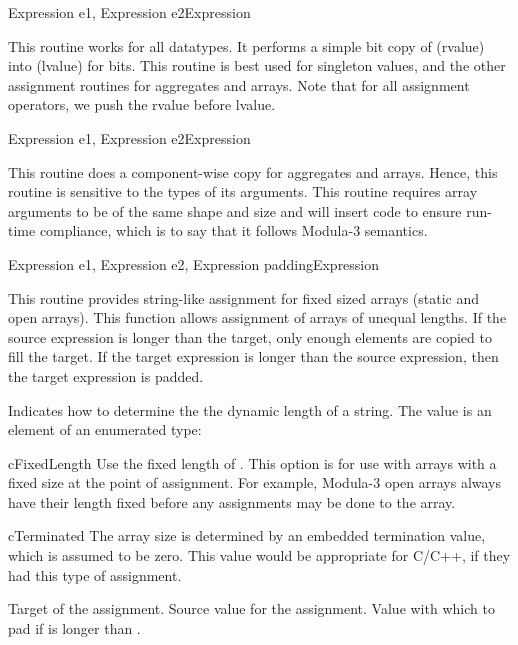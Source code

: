 	{Expression e1, Expression e2}{Expression}
\begin{functionality}
This routine works for all datatypes.  It performs a simple bit copy
of  (rvalue) into  (lvalue) for
 bits.  This routine is best used for
singleton values, and the other assignment routines for aggregates and
arrays.  Note that for all assignment operators, we push the rvalue
before lvalue.
\end{functionality}
	{Expression e1, Expression e2}{Expression}
\begin{functionality}
This routine does a component-wise copy for aggregates and arrays.
Hence, this routine is sensitive to the types of its arguments.  This
routine requires array arguments to be of the same shape and size and
will insert code to ensure run-time compliance, which is to say that
it follows Modula-3 semantics.
\end{functionality}
	{Expression e1, Expression e2, Expression padding}{Expression}
\begin{functionality}
This routine provides string-like assignment for fixed sized arrays
(\eg static and open arrays).  This function allows
assignment of arrays of unequal lengths.  If the source expression is
longer than the target, only enough elements are copied to fill the
target.  If the target expression is longer than the source
expression, then the target expression is padded.
\begin{Parameters}
 Indicates how to determine the the dynamic length of a
string.  The value is an element of an enumerated type:
\begin{Description}
\item [cFixedLength] Use the fixed length of .  This option is
for use with arrays with a fixed size at the point of assignment.  For
example, Modula-3 open arrays always have their length fixed before
any assignments may be done to the array.
\item [cTerminated] The array size is determined by an embedded
termination value, which is assumed to be zero.  This value would be
appropriate for C/C++, if they had this type of assignment.
\end{Description}
 Target of the assignment.
 Source value for the assignment.
 Value with which to pad  if  is
longer than . 
\end{Parameters}

\end{functionality}

